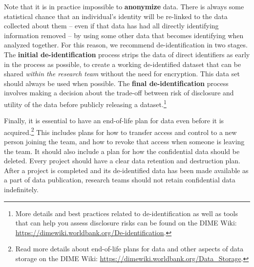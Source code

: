 \documentclass[
]{book}
\begin{document}
Note that it is in practice impossible
to \textbf{anonymize} data.
There is always some statistical chance that an individual's identity
will be re-linked to the data collected about them
-- even if that data has had all directly identifying information removed --
by using some other data that becomes identifying when analyzed together.
For this reason, we recommend de-identification in two stages.
The \textbf{initial de-identification} process strips the data of direct identifiers
as early in the process as possible,
to create a working de-identified dataset that
can be shared \emph{within the research team} without the need for encryption.
This data set should always be used when possible.
The \textbf{final de-identification} process involves
making a decision about the trade-off between
risk of disclosure and utility of the data
before publicly releasing a dataset.\footnote{More details and best practices related to de-identification
  as well as tools that can help you assess disclosure risks
  can be found on the DIME Wiki:
  \url{https://dimewiki.worldbank.org/De-identification}.}

Finally, it is essential to have an end-of-life plan for data even before it is acquired.\footnote{Read more details about end-of-life plans for data
  and other aspects of data storage on the DIME Wiki:
  \url{https://dimewiki.worldbank.org/Data_Storage}.}
This includes plans for how to transfer access and control to a new person joining the team,
and how to revoke that access when someone is leaving the team.
It should also include a plan for how the confidential data should be deleted.
Every project should have a clear data retention and destruction plan.
After a project is completed and its
de-identified data has been made available as a part of data publication,
research teams should not retain confidential data indefinitely.
\end{document}
